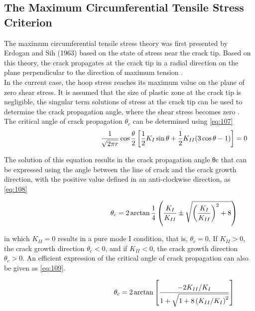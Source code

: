 \documentclass[fleqn, 12.5pt,a4paper]{report}
\begin{document}
\subsection{The Maximum Circumferential Tensile Stress Criterion}
The maximum circumferential tensile stress theory was first presented by Erdogan and Sih (1963) based on the state of stress near the crack tip. Based on this theory, the crack propagates at the crack tip in a radial direction on the plane perpendicular to the direction of maximum tension \cite{khoei2014extended}.\\
In the current case, the hoop stress reaches its maximum value on the plane of zero shear stress. It is assumed that the size of plastic zone at the crack tip is negligible, the singular term solutions of stress at the crack tip can be used to determine the crack propagation angle, where the shear stress becomes zero \cite{khoei2014extended}.
\\
The critical angle of crack propagation $\theta_c$ can be determined using \autoref{eq:107}
\begin{equation}\label{eq:107}\hspace{4.5cm}
\frac{1}{\sqrt{2 \pi r}} \cos \frac{\theta}{2}\left[\frac{1}{2} K_{I} \sin \theta+\frac{1}{2} K_{I I}(3 \cos \theta-1)\right]=0
\end{equation}

The solution of this equation results in the crack propagation angle θc that can be expressed using the angle between the line of crack and the crack growth direction, with the positive value defined in an anti-clockwise direction, as
\cite{khoei2014extended} \autoref{eq:108}

\begin{equation}\label{eq:108}\hspace{4.5cm}
\theta_{c}=2 \arctan \frac{1}{4}\left(\frac{K_{I}}{K_{I I}} \pm \sqrt{\left(\frac{K_{I}}{K_{I I}}\right)^{2}+8}\right)
\end{equation}

in which $K_{II} = 0$ results in a pure mode I condition, that is, $\theta_c = 0$. If $K_{II} > 0$, the crack growth direction
$\theta_c < 0$, and if $K_{II} < 0$, the crack growth direction $\theta_c > 0$. An efficient expression of the critical angle of
crack propagation can also be given as \autoref{eq:109}.

\begin{equation}\label{eq:109}\hspace{4.5cm}
\theta_{c}=2 \arctan \left[\frac{-2 K_{I I} / K_{I}}{1+\sqrt{1+8\left(K_{I I} / K_{I}\right)^{2}}}\right]
\end{equation}
\end{document}

